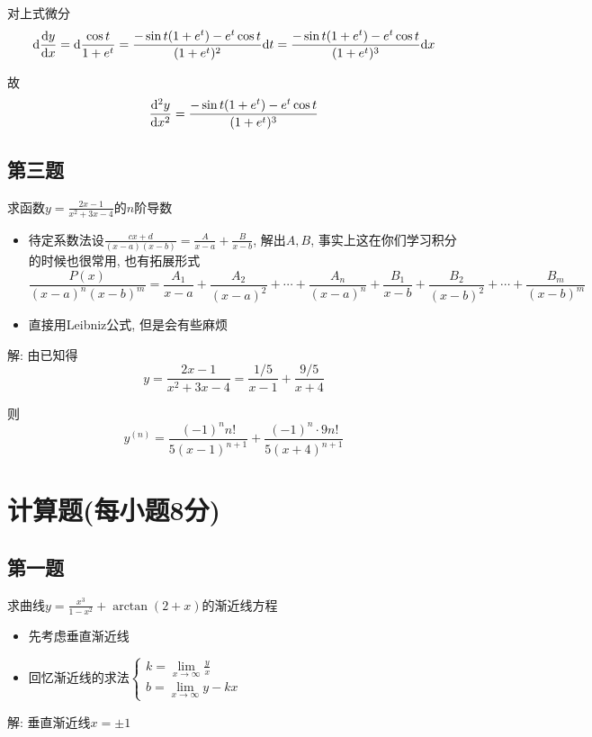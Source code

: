 \documentclass[10pt]{SelfArx} %
\numberwithin{dummy}{section}
\newenvironment{corollary}{\begin{cBox}\noindent{\bf\color{color1} 分析}}{\end{cBox}}
\begin{document}
对上式微分
\begin{displaymath}
{\rm d}\displaystyle\frac{{\rm d}y}{{\rm d}x}={\rm d}\displaystyle\frac{\cos t}{1+e^t}=\displaystyle\frac{-\sin t(1+e^t)-e^t\cos t}{(1+e^t)^2}{\rm d}t=\displaystyle\frac{-\sin t(1+e^t)-e^t\cos t}{(1+e^t)^3 }{\rm d}x
\end{displaymath}

故
\begin{displaymath}
\displaystyle\frac{{\rm d}^2y}{{\rm d}x^2}=\displaystyle\frac{-\sin t(1+e^t)-e^t\cos t}{(1+e^t)^3 }
\end{displaymath}
\subsection{第三题}
求函数$y=\displaystyle\frac{2x-1}{x^2+3x-4}$的$n$阶导数
\begin{corollary}
	\begin{itemize}
		\item 待定系数法设$\displaystyle\frac{cx+d}{(x-a)(x-b)}=\displaystyle\frac{A}{x-a}+\displaystyle\frac{B}{x-b}$, 解出$A,B$, 事实上这在你们学习积分的时候也很常用, 也有拓展形式
		\begin{displaymath}
			\displaystyle\frac{P(x)}{(x-a)^n(x-b)^m}=\displaystyle\frac{A_1}{x-a}+\displaystyle\frac{A_2}{(x-a)^2}+\cdots+\displaystyle\frac{A_n}{(x-a)^n}+\displaystyle\frac{B_1}{x-b}+\displaystyle\frac{B_2}{(x-b)^2}+\cdots+\displaystyle\frac{B_m}{(x-b)^m}
		\end{displaymath}
		\item 直接用Leibniz公式, 但是会有些麻烦
	\end{itemize}
\end{corollary}
解: 由已知得
\begin{displaymath}
	y=\displaystyle\frac{2x-1}{x^2+3x-4}=\displaystyle\frac{1/5}{x-1}+\displaystyle\frac{9/5}{x+4}
\end{displaymath}

则
\begin{displaymath}
y^{(n)}=\displaystyle\frac{(-1)^nn!}{5(x-1)^{n+1}}+\displaystyle\frac{(-1)^n\cdot 9n!}{5(x+4)^{n+1}}
\end{displaymath}
\section[计算题]{计算题(每小题8分)}
\subsection{第一题}
求曲线$y=\displaystyle\frac{x^3}{1-x^2}+\arctan(2+x)$的渐近线方程
\begin{corollary}
	\begin{itemize}
		\item 先考虑垂直渐近线
		\item 回忆渐近线的求法$\begin{cases}
		k=\lim\limits_{x\to\infty}\displaystyle\frac{y}{x}\\
		b=\lim\limits_{x\to\infty}y-kx
		\end{cases}$
	\end{itemize}
\end{corollary}
解: 垂直渐近线$x=\pm 1$
\end{document}
